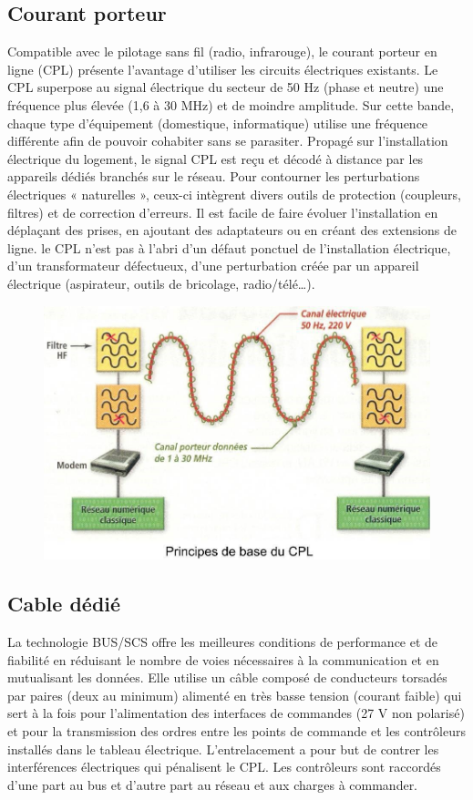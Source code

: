 \documentclass[12pt]{article}
\begin{document}
\subsection{Courant porteur}
Compatible avec le pilotage sans fil (radio, infrarouge), le courant porteur en ligne (CPL) présente l’avantage d’utiliser les circuits électriques existants. Le CPL superpose au signal électrique du secteur de 50 Hz (phase et neutre) une fréquence plus élevée (1,6 à 30 MHz) et de moindre amplitude. Sur cette bande, chaque type d’équipement (domestique, informatique) utilise une fréquence différente afin de pouvoir cohabiter sans se parasiter. Propagé sur l’installation électrique du logement, le signal CPL est reçu et décodé à distance par les appareils dédiés branchés sur le réseau. Pour contourner les perturbations électriques « naturelles », ceux-ci intègrent divers outils de protection (coupleurs, filtres) et de correction d’erreurs. Il est facile de faire évoluer l’installation en déplaçant des prises, en ajoutant des adaptateurs ou en créant des extensions de ligne. le CPL n’est pas à l’abri d’un défaut ponctuel de l’installation électrique, d’un transformateur défectueux, d’une perturbation créée par un appareil électrique (aspirateur, outils de bricolage, radio/télé…).

\begin{figure}[h]
\begin{center}
\includegraphics[scale=0.5]{CPL.jpg}
\end{center}
\end{figure}


\subsection{Cable dédié}
La technologie BUS/SCS offre les meilleures conditions de performance et de fiabilité en réduisant le nombre de voies nécessaires à la communication et en mutualisant les données. Elle utilise un câble composé de conducteurs torsadés par paires (deux au minimum) alimenté en très basse tension (courant faible) qui sert à la fois pour l'alimentation des interfaces de commandes (27 V non polarisé) et pour la transmission des ordres entre les points de commande et les contrôleurs installés dans le tableau électrique. L’entrelacement a pour but de contrer les interférences électriques qui pénalisent le CPL. Les contrôleurs sont raccordés d'une part au bus et d'autre part au réseau et aux charges à commander.
\end{document}
